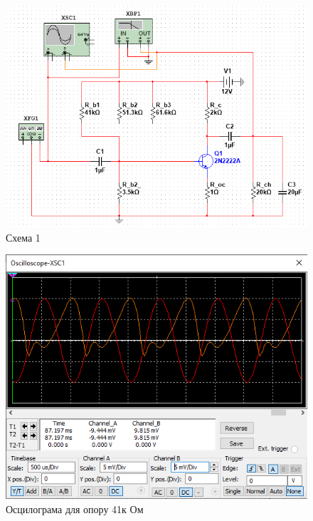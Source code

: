 \documentclass{article}
\begin{document}
\begin{normalsize}
	\begin{figure}[H]
		\centering
		\includegraphics[width=\textwidth]{1}
		\caption{Схема 1}
	\end{figure}

	\begin{figure}[H]
		\centering
		\includegraphics[width=\textwidth]{11}
		\caption{Осцилограма для опору 41к Ом}
	\end{figure}


\end{normalsize}
\end{document}
